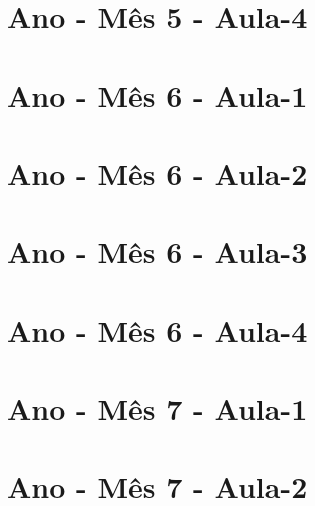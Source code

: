 \begin{multicols}{2}
\section[\sffamily 1\textordmasculine\space Ano - M\^{e}s 5 - Aula-4]{\textordmasculine\space Ano - M\^{e}s 5 - Aula-4}


\section[\sffamily 1\textordmasculine\space Ano - M\^{e}s 6 - Aula-1]{\textordmasculine\space Ano - M\^{e}s 6 - Aula-1}


\section[\sffamily 1\textordmasculine\space Ano - M\^{e}s 6 - Aula-2]{\textordmasculine\space Ano - M\^{e}s 6 - Aula-2}


\section[\sffamily 1\textordmasculine\space Ano - M\^{e}s 6 - Aula-3]{\textordmasculine\space Ano - M\^{e}s 6 - Aula-3}


\section[\sffamily 1\textordmasculine\space Ano - M\^{e}s 6 - Aula-4]{\textordmasculine\space Ano - M\^{e}s 6 - Aula-4}


\section[\sffamily 1\textordmasculine\space Ano - M\^{e}s 7 - Aula-1]{\textordmasculine\space Ano - M\^{e}s 7 - Aula-1}


\section[\sffamily 1\textordmasculine\space Ano - M\^{e}s 7 - Aula-2]{\textordmasculine\space Ano - M\^{e}s 7 - Aula-2}



\end{multicols}
